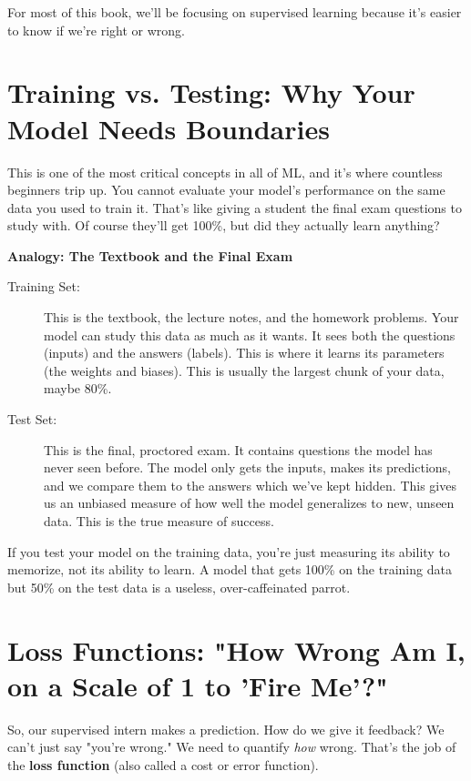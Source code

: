 \documentclass[11pt, letterpaper, openany]{book}
\begin{document}
For most of this book, we'll be focusing on supervised learning because it's easier to know if we're right or wrong.

\section{Training vs. Testing: Why Your Model Needs Boundaries}

This is one of the most critical concepts in all of ML, and it's where countless beginners trip up. You cannot evaluate your model's performance on the same data you used to train it. That's like giving a student the final exam questions to study with. Of course they'll get 100\%, but did they actually learn anything?

\textbf{Analogy: The Textbook and the Final Exam}

\begin{description}
    \item[Training Set:] This is the textbook, the lecture notes, and the homework problems. Your model can study this data as much as it wants. It sees both the questions (inputs) and the answers (labels). This is where it learns its parameters (the weights and biases). This is usually the largest chunk of your data, maybe 80\%.
    \item[Test Set:] This is the final, proctored exam. It contains questions the model has never seen before. The model only gets the inputs, makes its predictions, and we compare them to the answers which we've kept hidden. This gives us an unbiased measure of how well the model generalizes to new, unseen data. This is the true measure of success.
\end{description}

If you test your model on the training data, you're just measuring its ability to memorize, not its ability to learn. A model that gets 100\% on the training data but 50\% on the test data is a useless, over-caffeinated parrot.

\section{Loss Functions: "How Wrong Am I, on a Scale of 1 to 'Fire Me'?"}

So, our supervised intern makes a prediction. How do we give it feedback? We can't just say "you're wrong." We need to quantify \emph{how} wrong. That's the job of the \textbf{loss function} (also called a cost or error function).
\end{document}
